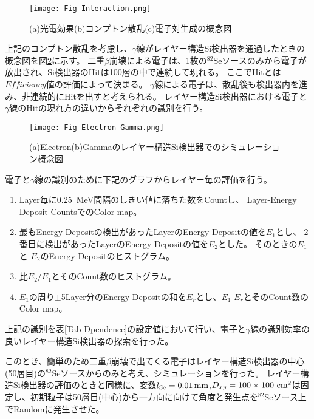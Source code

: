 \documentclass[a4paper,10pt]{jreport}
\begin{document}
\begin{figure}[H]
	\center
	\texttt{[image: Fig-Interaction.png]}
	\caption{(a)光電効果(b)コンプトン散乱(c)電子対生成の概念図} \label{Fig-Interaction}
\end{figure}

上記のコンプトン散乱を考慮し、$\gamma$線がレイヤー構造Si検出器を通過したときの概念図を図\ref{Fig-Electron-Gamma}に示す。
二重$\beta$崩壊による電子は、1枚の$^{82}$Seソースのみから電子が放出され、Si検出器のHitは100層の中で連続して現れる。
ここでHitとは$Efficiency$値の評価によって決まる。
$\gamma$線による電子は、散乱後も検出器内を進み、非連続的にHitを出すと考えられる。
レイヤー構造Si検出器における電子と$\gamma$線のHitの現れ方の違いからそれぞれの識別を行う。

\begin{figure}[H]
	\center
	\texttt{[image: Fig-Electron-Gamma.png]}
	\caption{(a)Electron(b)Gammaのレイヤー構造Si検出器でのシミュレーション概念図} \label{Fig-Electron-Gamma}
\end{figure}

電子と$\gamma$線の識別のために下記のグラフからレイヤー毎の評価を行う。

\begin{enumerate}
	\item Layer毎に\SI{0.25}{MeV}間隔のしきい値に落ちた数をCountし、
	Layer-Energy Deposit-CountsでのColor map。
	
	\item 最もEnergy Depositの検出があったLayerのEnergy Depositの値を$E_1$とし、
	2番目に検出があったLayerのEnergy Depositの値を$E_2$とした。
	そのときの$E_1$と $E_2$のEnergy Depositのヒストグラム。
	
	\item 比$E_2/E_1$とそのCount数のヒストグラム。
	
	\item $E_1$の周り$\pm$5Layer分のEnergy Depositの和を$E_r$とし、$E_1$-$E_r$とそのCount数のColor map。
	
\end{enumerate}

上記の識別を表\ref{Tab-Dpendence}の設定値において行い、電子と$\gamma$線の識別効率の良いレイヤー構造Si検出器の探索を行った。

このとき、簡単のため二重$\beta$崩壊で出てくる電子はレイヤー構造Si検出器の中心(50層目)の$^{82}$Seソースからのみと考え、シミュレーションを行った。
レイヤー構造Si検出器の評価のときと同様に、変数$l_{\rm{Se}} = \SI{0.01}{mm}$,$D_{xy} =100\times100\ \rm{cm}^2$は固定し、初期粒子は50層目(中心)から一方向に向けて角度と発生点を$^{82}$Seソース上でRandomに発生させた。
\end{document}
